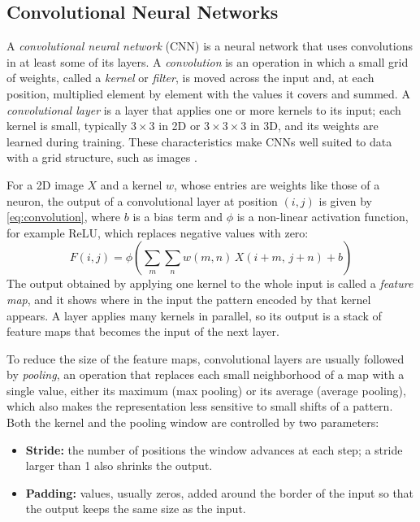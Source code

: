 \subsection{Convolutional Neural Networks}
\label{subsec:cnns}

A \emph{convolutional neural network} (CNN) is a neural network that uses convolutions in at least some of its layers. A \emph{convolution} is an operation in which a small grid of weights, called a \emph{kernel} or \emph{filter}, is moved across the input and, at each position, multiplied element by element with the values it covers and summed. A \emph{convolutional layer} is a layer that applies one or more kernels to its input; each kernel is small, typically $3 \times 3$ in 2D or $3 \times 3 \times 3$ in 3D, and its weights are learned during training. These characteristics make CNNs well suited to data with a grid structure, such as images \parencite{prince2023understanding}.

For a 2D image $X$ and a kernel $w$, whose entries are weights like those of a neuron, the output of a convolutional layer at position $(i, j)$ is given by \cref{eq:convolution}, where $b$ is a bias term and $\phi$ is a non-linear activation function, for example ReLU, which replaces negative values with zero:
\begin{equation}
  F(i,j) = \phi\!\left( \sum_{m}\sum_{n} w(m,n)\, X(i+m,\, j+n) + b \right)
  \label{eq:convolution}
\end{equation}
The output obtained by applying one kernel to the whole input is called a \emph{feature map}, and it shows where in the input the pattern encoded by that kernel appears. A layer applies many kernels in parallel, so its output is a stack of feature maps that becomes the input of the next layer.

To reduce the size of the feature maps, convolutional layers are usually followed by \emph{pooling}, an operation that replaces each small neighborhood of a map with a single value, either its maximum (max pooling) or its average (average pooling), which also makes the representation less sensitive to small shifts of a pattern. Both the kernel and the pooling window are controlled by two parameters:
\begin{itemize}
  \item \textbf{Stride:} the number of positions the window advances at each step; a stride larger than 1 also shrinks the output.
  \item \textbf{Padding:} values, usually zeros, added around the border of the input so that the output keeps the same size as the input.
\end{itemize}

